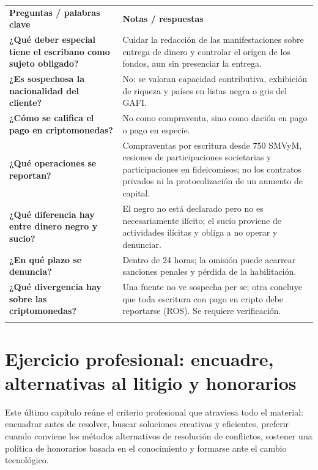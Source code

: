 \documentclass[12pt,oneside]{book}
\newcommand{\cq}[1]{\textbf{#1}}
\newcommand{\cornell}[3]{%
  \par\medskip\noindent\begingroup
  \renewcommand{\arraystretch}{1.25}%
  \begin{tabularx}{\textwidth}{|>{\raggedright\arraybackslash}p{0.27\textwidth}|>{\raggedright\arraybackslash}X|}
    \hline
    \multicolumn{2}{|>{\centering\arraybackslash}X|}{\cellcolor{azulacad!12}\textbf{Cuadro Cornell --- #1}}\\ \hline
    \cellcolor{gray!10}\textbf{Preguntas / palabras clave} & \cellcolor{gray!10}\textbf{Notas / respuestas} \\ \hline
    #2
    \multicolumn{2}{|>{\raggedright\arraybackslash}X|}{\cellcolor{azulacad!6}\textbf{Resumen.} #3}\\ \hline
  \end{tabularx}%
  \endgroup\par\medskip}
\begin{document}
\cornell{Prevención del lavado de activos y deberes ante la UIF}{
\cq{¿Qué deber especial tiene el escribano como sujeto obligado?} & Cuidar la redacción de las manifestaciones sobre entrega de dinero y controlar el origen de los fondos, aun sin presenciar la entrega. \\ \hline
\cq{¿Es sospechosa la nacionalidad del cliente?} & No: se valoran capacidad contributiva, exhibición de riqueza y países en listas negra o gris del GAFI. \\ \hline
\cq{¿Cómo se califica el pago en criptomonedas?} & No como compraventa, sino como dación en pago o pago en especie. \\ \hline
\cq{¿Qué operaciones se reportan?} & Compraventas por escritura desde 750 SMVyM, cesiones de participaciones societarias y participaciones en fideicomisos; no los contratos privados ni la protocolización de un aumento de capital. \\ \hline
\cq{¿Qué diferencia hay entre dinero negro y sucio?} & El negro no está declarado pero no es necesariamente ilícito; el sucio proviene de actividades ilícitas y obliga a no operar y denunciar. \\ \hline
\cq{¿En qué plazo se denuncia?} & Dentro de 24 horas; la omisión puede acarrear sanciones penales y pérdida de la habilitación. \\ \hline
\cq{¿Qué divergencia hay sobre las criptomonedas?} & Una fuente no ve sospecha per se; otra concluye que toda escritura con pago en cripto debe reportarse (ROS). Se requiere verificación. \\ \hline
}{El escribano, sujeto obligado, controla el origen de los fondos con criterios objetivos y no por prejuicios. Los pagos en criptomonedas plantean problemas de valor, calificación jurídica y trazabilidad, y el reporte a la UIF se rige por umbrales y por la naturaleza del acto.}

\chapter{Ejercicio profesional: encuadre, alternativas al litigio y honorarios}
\label{cap:ejercicio}

Este último capítulo reúne el criterio profesional que atraviesa todo el material: encuadrar antes de resolver, buscar soluciones creativas y eficientes, preferir cuando conviene los métodos alternativos de resolución de conflictos, sostener una política de honorarios basada en el conocimiento y formarse ante el cambio tecnológico.
\end{document}
